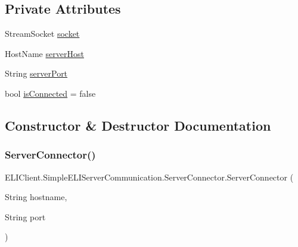 \subsection*{Private Attributes}
\begin{DoxyCompactItemize}
\item 
Stream\+Socket \hyperlink{class_e_l_i_client_1_1_simple_e_l_i_server_communication_1_1_server_connector_add9c36f3ca36f096570915423fd01522}{socket}
\item 
Host\+Name \hyperlink{class_e_l_i_client_1_1_simple_e_l_i_server_communication_1_1_server_connector_ab925d748f9a9b359302e877cb8c6c9b6}{server\+Host}
\item 
String \hyperlink{class_e_l_i_client_1_1_simple_e_l_i_server_communication_1_1_server_connector_a821828ede549ca68c383949588a5f5e1}{server\+Port}
\item 
bool \hyperlink{class_e_l_i_client_1_1_simple_e_l_i_server_communication_1_1_server_connector_a601bc05dedac1a49b3ec77ce7279362a}{is\+Connected} = false
\end{DoxyCompactItemize}


\subsection{Constructor \& Destructor Documentation}
\mbox{\label{class_e_l_i_client_1_1_simple_e_l_i_server_communication_1_1_server_connector_ad9a29fa265ea9a860f92ed58c11858e6}} 
\subsubsection{\texorpdfstring{Server\+Connector()}{ServerConnector()}}
{\footnotesize\ttfamily E\+L\+I\+Client.\+Simple\+E\+L\+I\+Server\+Communication.\+Server\+Connector.\+Server\+Connector (\begin{DoxyParamCaption}\item[{String}]{hostname,  }\item[{String}]{port }\end{DoxyParamCaption})\hspace{0.3cm}{\ttfamily [inline]}}



